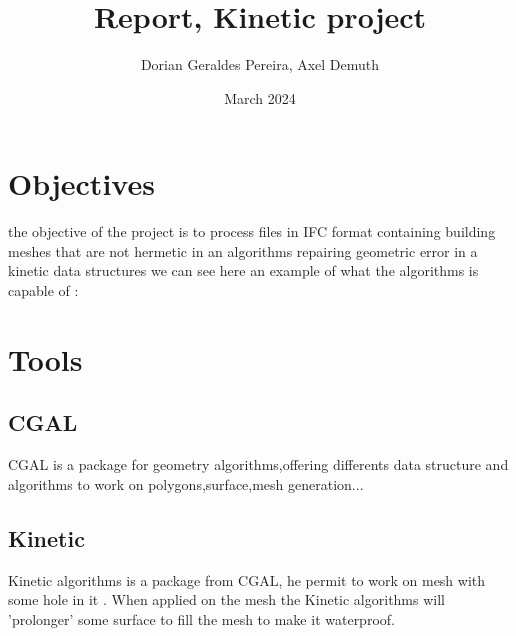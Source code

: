 \documentclass{article}
\title{Report, Kinetic project}
\author{Dorian Geraldes Pereira, Axel Demuth}
\date{March 2024}
\begin{document}
\maketitle
\tableofcontents
\newpage
\section{Objectives}
the objective of the project is to process files in IFC format containing building meshes that are not hermetic in an algorithms repairing
geometric error in a kinetic data structures
we can see here an example of what the algorithms is capable of :


\newpage
\section{Tools}
\subsection{CGAL}
CGAL is a package for geometry algorithms,offering differents data structure and algorithms
to work on polygons,surface,mesh generation... 
\subsection{Kinetic}
Kinetic algorithms is a package from CGAL, he permit to work on mesh with some hole in it .
When applied on the mesh the Kinetic algorithms will 'prolonger' some surface to fill the mesh to make it 
waterproof.
\nocite{*}
\printbibliography{} 
\end{document}
